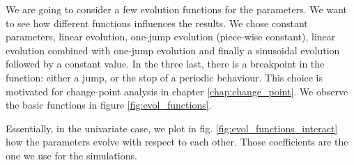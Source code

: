 \documentclass[11pt]{book}
\begin{document}
We are going to consider a few evolution functions for the parameters. We want to see how different functions influences the results. We chose constant parameters, linear evolution, one-jump evolution (piece-wise constant), linear evolution combined with one-jump evolution and finally a sinusoidal evolution followed by a constant value. In the three last, there is a breakpoint in the function: either a jump, or the stop of a periodic behaviour. This choice is motivated for change-point analysis in 
chapter \ref{chap:change_point}. We observe the basic functions in figure \ref{fig:evol_functions}.

Essentially, in the univariate case, we plot in fig. \ref{fig:evol_functions_interact} how the parameters evolve with respect to each other. Those coefficients are the one we use for the simulations. 
\end{document}
